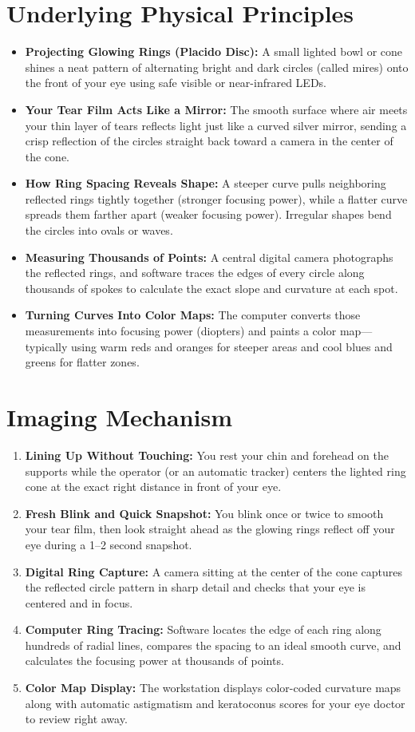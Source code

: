 \section{Underlying Physical Principles}
\begin{itemize}
    \item \textbf{Projecting Glowing Rings (Placido Disc):} A small lighted bowl or cone shines a neat pattern of alternating bright and dark circles (called mires) onto the front of your eye using safe visible or near-infrared LEDs.
    \item \textbf{Your Tear Film Acts Like a Mirror:} The smooth surface where air meets your thin layer of tears reflects light just like a curved silver mirror, sending a crisp reflection of the circles straight back toward a camera in the center of the cone.
    \item \textbf{How Ring Spacing Reveals Shape:} A steeper curve pulls neighboring reflected rings tightly together (stronger focusing power), while a flatter curve spreads them farther apart (weaker focusing power). Irregular shapes bend the circles into ovals or waves.
    \item \textbf{Measuring Thousands of Points:} A central digital camera photographs the reflected rings, and software traces the edges of every circle along thousands of spokes to calculate the exact slope and curvature at each spot.
    \item \textbf{Turning Curves Into Color Maps:} The computer converts those measurements into focusing power (diopters) and paints a color map---typically using warm reds and oranges for steeper areas and cool blues and greens for flatter zones.
\end{itemize}

\section{Imaging Mechanism}
\begin{enumerate}
    \item \textbf{Lining Up Without Touching:} You rest your chin and forehead on the supports while the operator (or an automatic tracker) centers the lighted ring cone at the exact right distance in front of your eye.
    \item \textbf{Fresh Blink and Quick Snapshot:} You blink once or twice to smooth your tear film, then look straight ahead as the glowing rings reflect off your eye during a 1--2 second snapshot.
    \item \textbf{Digital Ring Capture:} A camera sitting at the center of the cone captures the reflected circle pattern in sharp detail and checks that your eye is centered and in focus.
    \item \textbf{Computer Ring Tracing:} Software locates the edge of each ring along hundreds of radial lines, compares the spacing to an ideal smooth curve, and calculates the focusing power at thousands of points.
    \item \textbf{Color Map Display:} The workstation displays color-coded curvature maps along with automatic astigmatism and keratoconus scores for your eye doctor to review right away.
\end{enumerate}

